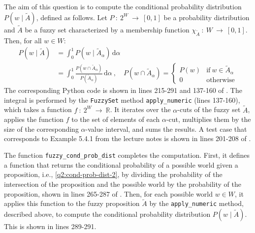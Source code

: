 The aim of this question is to compute the conditional probability distribution $P(w
  \mid \tilde{A})$, defined as follows.
Let $P~:~2^W~\to~[0, 1]$ be a probability distribution and $\tilde{A}$ be a fuzzy set
characterized by a membership function $\chi_{\tilde{A}}~:~W~\to~[0, 1]$.
Then, for all $w \in W$:
\begin{align}
  \label{q2:cond-prob-dist-1}
  P(w \mid \tilde{A}) & = \int_0^1 P(w \mid \tilde{A}_\alpha) \, \text{d}\alpha
  \\[2ex]
  \label{q2:cond-prob-dist-2}
                      & =
  \int_0^1 \frac{P(w \cap \tilde{A}_\alpha)}{P(\tilde{A}_\alpha)} \, \text{d}\alpha\
  ,\quad P(w \cap \tilde{A}_\alpha) =
  \begin{cases}
    P(w) & \text{if}\ w \in \tilde{A}_\alpha
    \\
    0    & \text{otherwise}
  \end{cases}
\end{align}
The corresponding Python code is shown in lines 215-291 and 137-160 of
\nameref{q2:main}.
The integral is performed by the \texttt{FuzzySet} method \texttt{apply\_numeric}
(lines 137-160), which takes a function $f~:~2^W~\to~\mathbb{R}$.
It iterates over the $\alpha$-cuts of the fuzzy set $\tilde{A}$, applies the function
$f$ to the set of elements of each $\alpha$-cut, multiplies them by the size of the
corresponding $\alpha$-value interval, and sums the results.
A test case that corresponds to Example 5.4.1 from the lecture notes is shown in lines
201-208 of \nameref{q2:test}.

The function \texttt{fuzzy\_cond\_prob\_dist} completes the computation.
First, it defines a function that returns the conditional probability of a possible
world given a proposition, i.e., \cref{q2:cond-prob-dist-2}, by dividing the
probability of the intersection of the proposition and the possible world by the
probability of the proposition, shown in lines 265-287 of \nameref{q2:main}.
Then, for each possible world $w \in W$, it applies this function to the fuzzy
proposition $\tilde{A}$ by the \texttt{apply\_numeric} method, described above, to
compute the conditional probability distribution $P(w \mid \tilde{A})$.
This is shown in lines 289-291.

